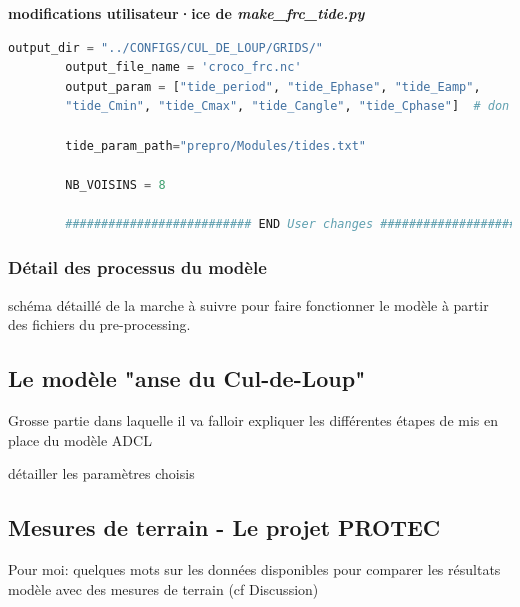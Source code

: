 \documentclass[10pt,a4paper,titlepage]{article}
\begin{document}
\begin{codeEnv}{\textbf{modifications utilisateur·ice de \textit{make\_frc\_tide.py}}}
\begin{lstlisting}[language=python]
        output_dir = "../CONFIGS/CUL_DE_LOUP/GRIDS/"
        output_file_name = 'croco_frc.nc'
        output_param = ["tide_period", "tide_Ephase", "tide_Eamp",
        "tide_Cmin", "tide_Cmax", "tide_Cangle", "tide_Cphase"]  # don't change the order

        tide_param_path="prepro/Modules/tides.txt"

        NB_VOISINS = 8

        ########################## END User changes ##########################
    \end{lstlisting}
\end{codeEnv}

\subsubsection{Détail des processus du modèle}
schéma détaillé de la marche à suivre pour faire fonctionner le modèle à partir des fichiers du pre-processing.

\subsection{Le modèle "anse du Cul-de-Loup"}

Grosse partie dans laquelle il va falloir expliquer les différentes étapes de mis en place du modèle ADCL

détailler les paramètres choisis

\subsection{Mesures de terrain - Le projet PROTEC}

Pour moi: quelques mots sur les données disponibles pour comparer les résultats modèle avec des mesures de terrain (cf Discussion)
\end{document}
